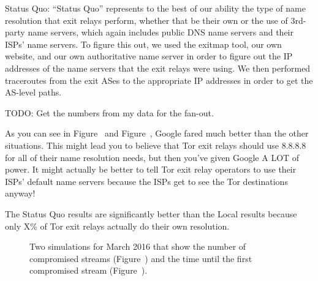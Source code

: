 Status Quo: ``Status Quo'' represents to the best of our ability the type of name resolution 
that exit relays perform, whether that be their own or the use of 3rd-party name servers, 
which again includes public DNS name servers and their ISPs' name servers. To figure this 
out, we used the exitmap tool, our own website, and our own authoritative name server 
in order to figure out the IP addresses of the name servers that the exit relays were 
using. We then performed traceroutes from the exit ASes to the appropriate IP addresses 
in order to get the AS-level paths.

TODO: Get the numbers from my data for the fan-out.

As you can see in Figure~ and
Figure~, 
Google fared much better than the other situations. This might lead you to believe that 
Tor exit relays should use 8.8.8.8 for all of their name resolution needs, but then you've 
given Google A LOT of power. It might actually be better to tell Tor exit relay operators 
to use their ISPs' default name servers because the ISPs get to see the Tor destinations 
anyway!

The Status Quo results are significantly better than the Local results because only X\% 
of Tor exit relays actually do their own resolution.

\begin{figure}[t]
\centering
{}
\caption{Two simulations for March 2016 that show the number of compromised
	streams (Figure~) and the time until the
	first compromised stream (Figure~).}
\label{fig:compromise-stream-time}
\end{figure}

